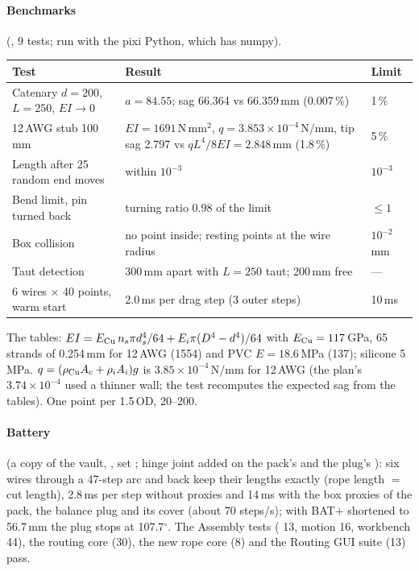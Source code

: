 \paragraph{Benchmarks} (, 9 tests; run with the pixi Python, which has numpy).
\begin{center}\small
\begin{tabularx}{\linewidth}{@{}lXl@{}}
\toprule
Test & Result & Limit \\
\midrule
Catenary $d=200$, $L=250$, $EI\to0$ & $a=84.55$; sag 66.364 vs 66.359\,mm (0.007\,\%) & 1\,\% \\
12\,AWG stub 100\,mm & $EI=1691$\,N\,mm$^2$, $q=3.853\times10^{-4}$\,N/mm, tip sag 2.797 vs $qL^4/8EI=2.848$\,mm (1.8\,\%) & 5\,\% \\
Length after 25 random end moves & within $10^{-3}$ & $10^{-3}$ \\
Bend limit, pin turned back & turning ratio $0.98$ of the limit & $\le1$ \\
Box collision & no point inside; resting points at the wire radius & $10^{-2}$\,mm \\
Taut detection & 300\,mm apart with $L=250$ taut; 200\,mm free & --- \\
6 wires $\times$ 40 points, warm start & 2.0\,ms per drag step (3 outer steps) & 10\,ms \\
\bottomrule
\end{tabularx}
\end{center}
The tables: $EI=E_{\rm Cu}\,n_s\pi d_s^4/64+E_i\pi(D^4-d^4)/64$ with $E_{\rm Cu}=117$\,GPa, 65 strands of 0.254\,mm for
12\,AWG (1554) and PVC $E=18.6$\,MPa (137); silicone 5\,MPa. $q=(\rho_{\rm Cu}A_c+\rho_iA_i)g$ is
$3.85\times10^{-4}$\,N/mm for 12\,AWG (the plan's $3.74\times10^{-4}$ used a thinner wall; the test recomputes the
expected sag from the tables). One point per 1.5\,OD, 20--200.

\paragraph{Battery} (a copy of the vault, , set ; hinge
joint added on the pack's  and the plug's ): six wires through a 47-step arc and back keep
their lengths exactly (rope length $=$ cut length), 2.8\,ms per step without proxies and 14\,ms with the box proxies
of the pack, the balance plug and its cover (about 70 steps/s); with BAT$+$ shortened to 56.7\,mm the plug stops at
107.7$^\circ$. The Assembly tests ( 13, motion 16, workbench 44), the routing core (30), the new
rope core (8) and the Routing GUI suite (13) pass.

